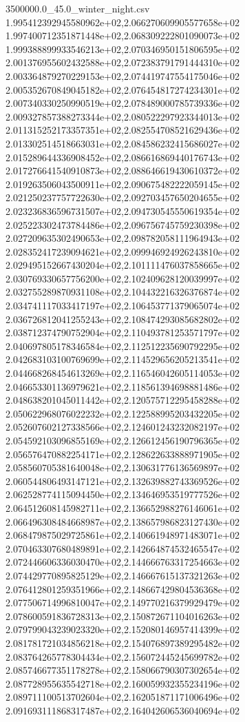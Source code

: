 \begin{filecontents*}{3500000.0_45.0_winter_night.csv}
1.995412392945580962e+02,2.066270609905577658e+02
1.997400712351871448e+02,2.068309222801090073e+02
1.999388899933546213e+02,2.070346950151806595e+02
2.001376955602432588e+02,2.072383791791444310e+02
2.003364879270229153e+02,2.074419747554175046e+02
2.005352670849045182e+02,2.076454817274234301e+02
2.007340330250990519e+02,2.078489000785739336e+02
2.009327857388273344e+02,2.080522297923344013e+02
2.011315252173357351e+02,2.082554708521629436e+02
2.013302514518663031e+02,2.084586232415686027e+02
2.015289644336908452e+02,2.086616869440176743e+02
2.017276641540910873e+02,2.088646619430610372e+02
2.019263506043500911e+02,2.090675482222059145e+02
2.021250237757722630e+02,2.092703457650204655e+02
2.023236836596731507e+02,2.094730545550619354e+02
2.025223302473784486e+02,2.096756745759230398e+02
2.027209635302490653e+02,2.098782058111964943e+02
2.028352417239094621e+02,2.099946924926243810e+02
2.029495152667430204e+02,2.101111476037858665e+02
2.030769330657756200e+02,2.102409628120039997e+02
2.032755289870931108e+02,2.104432216326376874e+02
2.034741117033417197e+02,2.106453771379065074e+02
2.036726812041255243e+02,2.108474293085682802e+02
2.038712374790752904e+02,2.110493781253571797e+02
2.040697805178346584e+02,2.112512235690792295e+02
2.042683103100769699e+02,2.114529656205213541e+02
2.044668268454613269e+02,2.116546042605114053e+02
2.046653301136979621e+02,2.118561394698881486e+02
2.048638201045011442e+02,2.120575712295458288e+02
2.050622968076022232e+02,2.122588995203432205e+02
2.052607602127338566e+02,2.124601243232082197e+02
2.054592103096855169e+02,2.126612456190796365e+02
2.056576470882254171e+02,2.128622633888971905e+02
2.058560705381640048e+02,2.130631776136569897e+02
2.060544806493147121e+02,2.132639882743369526e+02
2.062528774115094450e+02,2.134646953519777526e+02
2.064512608145982711e+02,2.136652988276146061e+02
2.066496308484668987e+02,2.138657986823127430e+02
2.068479875029725861e+02,2.140661948971483071e+02
2.070463307680489891e+02,2.142664874532465547e+02
2.072446606336030470e+02,2.144666763317254663e+02
2.074429770895825129e+02,2.146667615137321263e+02
2.076412801259351966e+02,2.148667429804536368e+02
2.077506714996810047e+02,2.149770216379929479e+02
2.078600591836728313e+02,2.150872671104016263e+02
2.079799043239023320e+02,2.152080146957414399e+02
2.081781721034856218e+02,2.154076897389295482e+02
2.083764265778304434e+02,2.156072445245699782e+02
2.085746677351178278e+02,2.158066790307302654e+02
2.087728955635542718e+02,2.160059932355234196e+02
2.089711100513702604e+02,2.162051871171006496e+02
2.091693111868317487e+02,2.164042606536040694e+02

\end{filecontents*}
